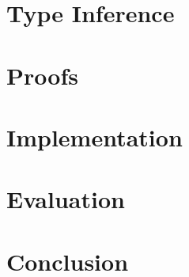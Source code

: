 \documentclass[master=cws,masteroption=ai]{kulemt}
\let\section\chapter
\begin{document}
\section{Type Inference}





\section{Proofs}


\section{Implementation}


\section{Evaluation}


\section{Conclusion}


\appendixpage*          %
\appendix
% 

\backmatter



\end{document}
